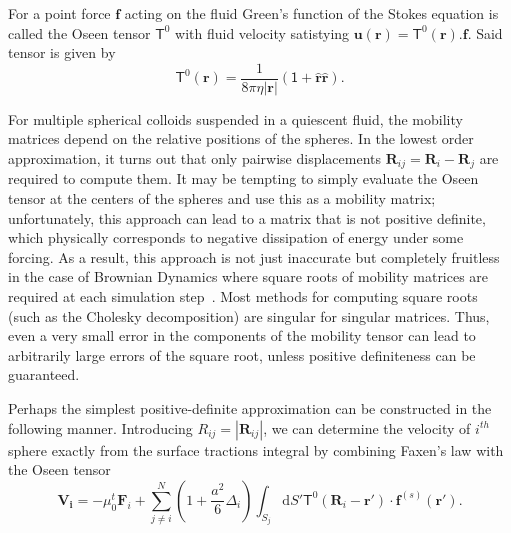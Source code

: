 \documentclass{doctoral}
\newcommand{\dd}{\mathrm{d}}
\newcommand{\mm}[1]{\bm{\mathsf{#1}}} %
\begin{document}
For a point force $\bm{f}$ acting on the fluid Green's function of the Stokes equation is called the Oseen tensor $\mm{T}^0$ with fluid velocity satistying $\bm{u}(\bm{r}) = \mm{T}^{0}(\bm{r}).
    \bm{f}$.
Said tensor is given by
\begin{equation}
    \mm{T}^{0}(\bm{r}) = \frac{1}{8\pi\eta |\bm{r}|} \left( \mm{1} + \bm{\hat{r}}\bm{\hat{r}}\right).
\end{equation}

For multiple spherical colloids suspended in a quiescent fluid, the mobility matrices depend on the relative positions of the spheres. In the lowest order approximation, it turns out that only pairwise displacements $\bm{R}_{ij} = \bm{R}_i - \bm{R}_j$ are required to compute them.
It may be tempting to simply evaluate the Oseen tensor at the centers of the spheres and use this as a mobility matrix; unfortunately, this approach can lead to a matrix that is not positive definite, which physically corresponds to negative dissipation of energy under some forcing.
As a result, this approach is not just inaccurate but completely fruitless in the case of Brownian Dynamics where square roots of mobility matrices are required at each simulation step~\cite{Nagele_2013,Ermak_1978}.
Most methods for computing square roots (such as the Cholesky decomposition) are singular for singular matrices.
Thus, even a very small error in the components of the mobility tensor can lead to arbitrarily large errors of the square root, unless positive definiteness can be guaranteed.

Perhaps the simplest positive-definite approximation can be constructed in the following manner. Introducing $R_{ij} = |\bm{R}_{ij}|$, we can determine the velocity of $i^{th}$ sphere exactly from the surface tractions integral by combining Faxen's law \cite{Faxen_1922} with the Oseen tensor
\begin{equation}
    \bm{V_i} =
    -\mu_0^t \bm{F}_i
    + \sum_{j\neq i}^N
    \left(1 + \frac{a^2}{6} \Delta_i\right)
    \int_{S_j} \dd S' \mm{T}^0(\bm{R}_i-\bm{r'})\cdot \bm{f}^{(s)}(\bm{r'}).
    \label{eqn:faxen-theorem}
\end{equation}
\end{document}
